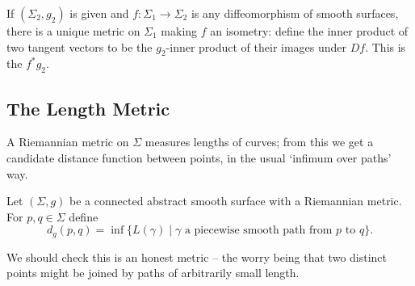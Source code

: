 \begin{example}
    If $(\Sigma_2, g_2)$ is given and $f: \Sigma_1 \rightarrow \Sigma_2$ is any diffeomorphism of smooth surfaces, there is a unique metric on $\Sigma_1$ making $f$ an isometry: define the inner product of two tangent vectors to be the $g_2$-inner product of their images under $Df$. This is the  $f^* g_2$.
\end{example}

\subsection{The Length Metric}

A Riemannian metric on $\Sigma$ measures lengths of curves; from this we get a candidate distance function between points, in the usual `infimum over paths' way.

\begin{definition}
    Let $(\Sigma, g)$ be a connected abstract smooth surface with a Riemannian metric. For $p, q \in \Sigma$ define
    $$
    d_g(p, q) = \inf \{L(\gamma) \mid \gamma \text{ a piecewise smooth path from } p \text{ to } q\}.
    $$
\end{definition}

We should check this is an honest metric -- the worry being that two distinct points might be joined by paths of arbitrarily small length.

